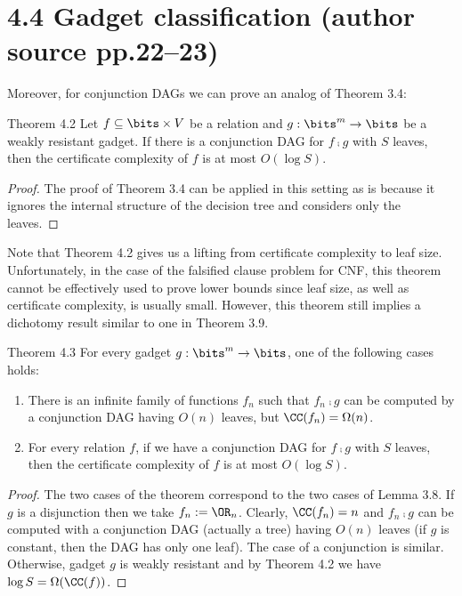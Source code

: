 \section*{4.4 Gadget classification (author source pp.22--23)}
Moreover, for conjunction DAGs we can prove an analog of Theorem 3.4:
\begin{originalresult}{Theorem 4.2}
Let $f\subseteq\bits\times V$ be a relation and $g:\bits^m\to\bits$ be a weakly resistant gadget. If there is a conjunction DAG for $f\comp g$ with $S$ leaves, then the certificate complexity of $f$ is at most $O(\log S)$.
\end{originalresult}
\begin{proof}
The proof of Theorem 3.4 can be applied in this setting as is because it ignores the internal structure of the decision tree and considers only the leaves.
\end{proof}
Note that Theorem 4.2 gives us a lifting from certificate complexity to leaf size. Unfortunately, in the case of the falsified clause problem for CNF, this theorem cannot be effectively used to prove lower bounds since leaf size, as well as certificate complexity, is usually small. However, this theorem still implies a dichotomy result similar to one in Theorem 3.9.
\begin{originalresult}{Theorem 4.3}
For every gadget $g:\bits^m\to\bits$, one of the following cases holds:
\begin{enumerate}
\item[(i)] There is an infinite family of functions $f_n$ such that $f_n\comp g$ can be computed by a conjunction DAG having $O(n)$ leaves, but $\CC(f_n)=\Omega(n)$.
\item[(ii)] For every relation $f$, if we have a conjunction DAG for $f\comp g$ with $S$ leaves, then the certificate complexity of $f$ is at most $O(\log S)$.
\end{enumerate}
\end{originalresult}
\begin{proof}
The two cases of the theorem correspond to the two cases of Lemma 3.8. If $g$ is a disjunction then we take $f_n:=\OR_n$. Clearly, $\CC(f_n)=n$ and $f_n\comp g$ can be computed with a conjunction DAG (actually a tree) having $O(n)$ leaves (if $g$ is constant, then the DAG has only one leaf). The case of a conjunction is similar.
Otherwise, gadget $g$ is weakly resistant and by Theorem 4.2 we have $\log S=\Omega(\CC(f))$.
\end{proof}
